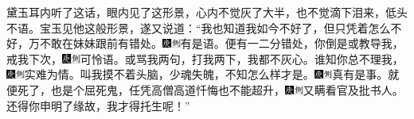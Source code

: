黛玉耳内听了这话，眼内见了这形景，心内不觉灰了大半，也不觉滴下泪来，低头不语。宝玉见他这般形景，遂又说道：“我也知道我如今不好了，但只凭着怎么不好，万不敢在妹妹跟前有错处。{\includegraphics[width=3mm]{../Images/00004}\includegraphics[width=3mm]{../Images/00011}\footnotesize \kaishu 有是语。}便有一二分错处，你倒是或教导我，戒我下次，{\includegraphics[width=3mm]{../Images/00004}\includegraphics[width=3mm]{../Images/00011}\footnotesize \kaishu 可怜语。}或骂我两句，打我两下，我都不灰心。谁知你总不理我，{\includegraphics[width=3mm]{../Images/00004}\includegraphics[width=3mm]{../Images/00011}\footnotesize \kaishu 实难为情。}叫我摸不着头脑，少魂失魄，不知怎么样才是。{\includegraphics[width=3mm]{../Images/00004}\includegraphics[width=3mm]{../Images/00011}\footnotesize \kaishu 真有是事。}就便死了，也是个屈死鬼，任凭高僧高道忏悔也不能超升，{\includegraphics[width=3mm]{../Images/00004}\includegraphics[width=3mm]{../Images/00011}\footnotesize \kaishu 又瞒看官及批书人。}还得你申明了缘故，我才得托生呢！”

